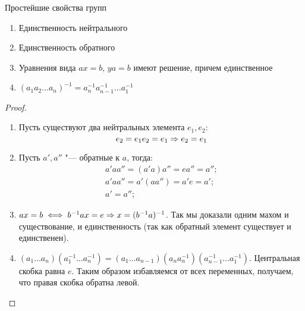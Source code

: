 \begin{theorem}{Простейшие свойства групп}
	\begin{enumerate}
		\item Единственность нейтрального
		\item Единственность обратного
		\item 
			Уравнения вида $ax=b$, $ya=b$ имеют решение, причем единственное
		\item $(a_1 a_2 \dots a_n)^{-1} = a_n^{-1} a_{n-1}^{-1} \dots a_1^{-1}$
   	\end{enumerate}
\end{theorem}
\begin{proof}
	\begin{enumerate}
		\item
			Пусть существуют два нейтральных элемента $e_1, e_2$:
			\[e_2 = e_1 e_2 = e_1 \Rightarrow e_2 = e_1\]
		\item
			Пусть $a', a''$ "--- обратные к $a$, тогда:
			\begin{gather*}
			a'aa'' = (a'a)a''= ea'' = a''; \\
			a'aa'' = a'(aa'') = a'e = a'; \\
			a' = a'';
			\end{gather*}
		\item
			$ax = b \iff b^{-1}ax = e \Rightarrow x = (b^{-1}a)^{-1}$.
			Так мы доказали одним махом и существование, и единственность (так как обратный элемент существует и единственен).
		\item
			$(a_1 \dots a_n) (a_1^{-1} \dots a_n^{-1}) = (a_1 \dots a_{n-1})(a_n a_n^{-1})(a_{n-1}^{-1} \dots a_1^{-1})$.
			Центральная скобка равна $e$. Таким образом избавляемся от всех переменных, получаем, что правая скобка обратна левой. 
	\end{enumerate}
\end{proof}
	
